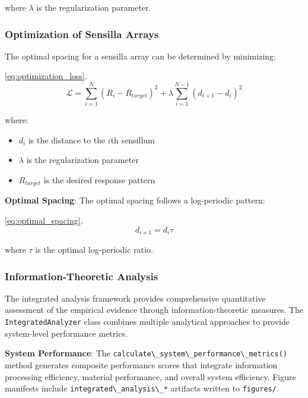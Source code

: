 \documentclass[
  13pt,
  a4paperpaper,
  12pt]{article}
\newcommand{\passthrough}[1]{#1}
\providecommand{\tightlist}{%
  \setlength{\itemsep}{0pt}\setlength{\parskip}{0pt}}
\begin{document}
where \(\lambda\) is the regularization parameter.

\subsubsection{Optimization of Sensilla
Arrays}\label{optimization-of-sensilla-arrays}

The optimal spacing for a sensilla array can be determined by
minimizing:

\eqref{eq:optimization_loss}. \begin{equation}
\mathcal{L} = \sum_{i=1}^{N} \left(R_i - R_{target}\right)^2 + \lambda \sum_{i=1}^{N-1} (d_{i+1} - d_i)^2 \label{eq:optimization_loss}
\end{equation}

where:

\begin{itemize}
\tightlist
\item
  \(d_i\) is the distance to the \(i\)th sensillum
\item
  \(\lambda\) is the regularization parameter
\item
  \(R_{target}\) is the desired response pattern
\end{itemize}

\textbf{Optimal Spacing}: The optimal spacing follows a log-periodic
pattern:

\eqref{eq:optimal_spacing}. \begin{equation}
d_{i+1} = d_i \tau \label{eq:optimal_spacing}
\end{equation}

where \(\tau\) is the optimal log-periodic ratio.

\subsubsection{Information-Theoretic
Analysis}\label{information-theoretic-analysis}

The integrated analysis framework provides comprehensive quantitative
assessment of the empirical evidence through information-theoretic
measures. The \passthrough{\lstinline!IntegratedAnalyzer!} class
combines multiple analytical approaches to provide system-level
performance metrics.

\textbf{System Performance}: The
\passthrough{\lstinline!calculate\_system\_performance\_metrics()!}
method generates composite performance scores that integrate information
processing efficiency, material performance, and overall system
efficiency. Figure manifests include
\passthrough{\lstinline!integrated\_analysis\_*!} artifacts written to
\passthrough{\lstinline!figures/!}.
\end{document}
